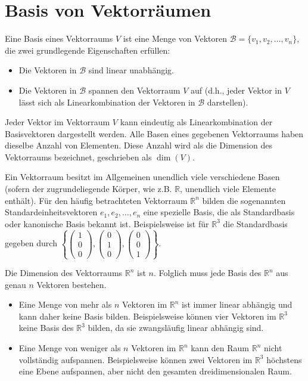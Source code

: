 \chapter{Basis von Vektorräumen}

Eine Basis eines Vektorraums $V$ ist eine Menge von Vektoren $\mathcal{B} =
    \{v_1, v_2, \dots, v_n\}$, die zwei grundlegende Eigenschaften erfüllen:
\begin{itemize}
    \item Die Vektoren in $\mathcal{B}$ sind linear unabhängig.
    \item Die Vektoren in $\mathcal{B}$ spannen den Vektorraum $V$ auf (d.h., jeder
          Vektor in $V$ lässt sich als Linearkombination der Vektoren in $\mathcal{B}$
          darstellen).
\end{itemize}
Jeder Vektor im Vektorraum $V$ kann eindeutig als Linearkombination der Basisvektoren dargestellt werden. Alle Basen eines gegebenen Vektorraums haben dieselbe Anzahl von Elementen. Diese Anzahl wird als die Dimension des Vektorraums bezeichnet, geschrieben als $\dim(V)$.

Ein Vektorraum besitzt im Allgemeinen unendlich viele verschiedene Basen
(sofern der zugrundeliegende Körper, wie z.B. $\mathbb{R}$, unendlich viele
Elemente enthält). Für den häufig betrachteten Vektorraum $\mathbb{R}^n$ bilden
die sogenannten Standardeinheitsvektoren $e_1, e_2, \dots, e_n$ eine spezielle
Basis, die als Standardbasis oder kanonische Basis bekannt ist. Beispielsweise
ist für $\mathbb{R}^3$ die Standardbasis gegeben durch $\left\{\begin{pmatrix} 1 \\ 0 \\ 0 \end{pmatrix}, \begin{pmatrix} 0 \\ 1 \\ 0 \end{pmatrix}, \begin{pmatrix} 0 \\ 0 \\ 1 \end{pmatrix}\right\}$.

Die Dimension des Vektorraums $\mathbb{R}^n$ ist $n$. Folglich muss jede Basis
des $\mathbb{R}^n$ aus genau $n$ Vektoren bestehen.
\begin{itemize}
    \item Eine Menge von mehr als $n$ Vektoren im $\mathbb{R}^n$ ist immer linear
          abhängig und kann daher keine Basis bilden. Beispielsweise können vier Vektoren
          im $\mathbb{R}^3$ keine Basis des $\mathbb{R}^3$ bilden, da sie zwangsläufig
          linear abhängig sind.
    \item Eine Menge von weniger als $n$ Vektoren im $\mathbb{R}^n$ kann den Raum
          $\mathbb{R}^n$ nicht vollständig aufspannen. Beispielsweise können zwei
          Vektoren im $\mathbb{R}^3$ höchstens eine Ebene aufspannen, aber nicht den
          gesamten dreidimensionalen Raum.
\end{itemize}


